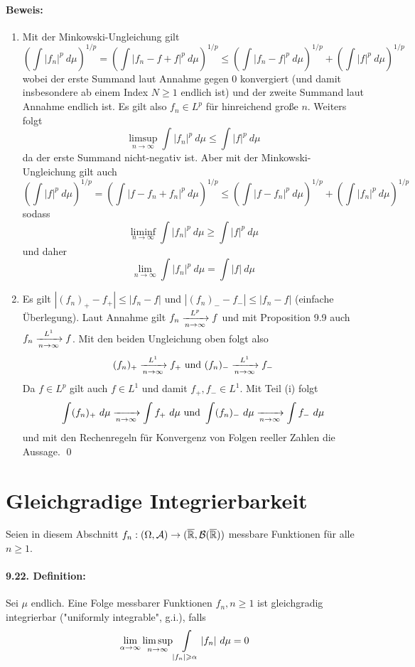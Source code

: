 \paragraph{Beweis:}
\begin{enumerate}[label=(\roman*)]
    \item Mit der Minkowski-Ungleichung gilt
    $$\left(\int|f_n|^p\ d\mu\right)^{1/p}=\left(\int|f_n-f+f|^p\ d\mu\right)^{1/p}\leq\left(\int|f_n-f|^p\ d\mu\right)^{1/p}+\left(\int|f|^p\ d\mu\right)^{1/p}$$
    wobei der erste Summand laut Annahme gegen $0$ konvergiert (und damit insbesondere ab einem Index $N\geq1$ endlich ist) und der zweite Summand laut Annahme endlich ist. Es gilt also $f_n\in L^p$ f\"ur hinreichend gro\ss{}e $n$. Weiters folgt
    $$\limsup_{n\to\infty}\int|f_n|^p\ d\mu\leq\int|f|^p\ d\mu$$
    da der erste Summand nicht-negativ ist.
    Aber mit der Minkowski-Ungleichung gilt auch
    $$\left(\int|f|^p\ d\mu\right)^{1/p}=\left(\int|f-f_n+f_n|^p\ d\mu\right)^{1/p}\leq\left(\int|f-f_n|^p\ d\mu\right)^{1/p}+\left(\int|f_n|^p\ d\mu\right)^{1/p}$$
    sodass 
    $$\liminf_{n\to\infty}\int|f_n|^p\ d\mu\geq\int|f|^p\ d\mu$$
    und daher $$\lim_{n\to\infty}\int|f_n|^p\ d\mu=\int|f|\ d\mu$$
    \item Es gilt $|(f_n)_+-f_+|\leq|f_n-f|$ und $|(f_n)_--f_-|\leq|f_n-f|$ (einfache \"Uberlegung). Laut Annahme gilt $f_n\nto{L^p}{n\to\infty}f$ und mit Proposition 9.9 auch $f_n\nto{L^1}{n\to\infty}f$. Mit den beiden Ungleichung oben folgt also
    $$(f_n)_+\nto{L^1}{n\to\infty}f_+\text{ und }(f_n)_-\nto{L^1}{n\to\infty}f_-$$
    Da $f\in L^p$ gilt auch $f\in L^1$ und damit $f_+,f_-\in L^1$. Mit Teil (i) folgt
    $$\int(f_n)_+\ d\mu\nto{}{n\to\infty}\int f_+\ d\mu\text{ und }\int(f_n)_-\ d\mu\nto{}{n\to\infty}\int f_-\ d\mu$$
    und mit den Rechenregeln f\"ur Konvergenz von Folgen reeller Zahlen die Aussage. \qed
\end{enumerate}

\section*{Gleichgradige Integrierbarkeit}
Seien in diesem Abschnitt $f_n:(\Omega,\mathcal{A})\to(\overline{\mathbb{R}},\mathcal{B}(\overline{\mathbb{R}}))$ messbare Funktionen f\"ur alle $n\geq1$.

\paragraph{9.22. Definition:} Sei $\mu$ endlich. Eine Folge messbarer Funktionen $f_n,n\geq1$ ist gleichgradig integrierbar ("uniformly integrable", g.i.), falls
$$\lim_{\alpha\to\infty}\limsup_{n\to\infty}\int\displaylimits_{|f_n|\geq\alpha}|f_n|\ d\mu=0$$

